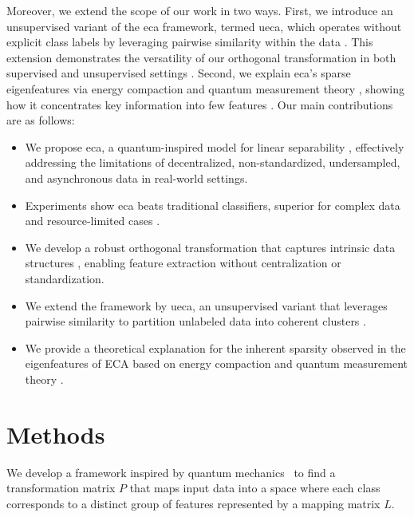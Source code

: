 \documentclass[lettersize,journal]{IEEEtran}
\begin{document}
Moreover, we extend the scope of our work in two ways. First, we introduce an unsupervised variant of the \gls{eca} framework, termed \gls{ueca}, which operates without explicit class labels by leveraging pairwise similarity within the data \cite{wang2022preserving, niu2023multi}. This extension demonstrates the versatility of our orthogonal transformation in both supervised and unsupervised settings \cite{fang2017orthogonal, kerenidis2021classical}. Second, we explain \gls{eca}'s sparse eigenfeatures via energy compaction \cite{bandoh2009mathematical, tuqan2000state} and quantum measurement theory \cite{nielsen2010quantum}, showing how it concentrates key information into few features \cite{lin2020sparsity}. Our main contributions are as follows:
\begin{itemize}
\item We propose \gls{eca}, a quantum-inspired model for linear separability \cite{chia2020quantum}, effectively addressing the limitations of decentralized, non-standardized, undersampled, and asynchronous data in real-world settings.
\item Experiments show \gls{eca} beats traditional classifiers, superior for complex data and resource-limited cases \cite{shao2022faster}.
\item We develop a robust orthogonal transformation that captures intrinsic data structures \cite{kerenidis2021classical, fang2017orthogonal}, enabling feature extraction without centralization or standardization.
\item We extend the framework by \gls{ueca}, an unsupervised variant that leverages pairwise similarity to partition unlabeled data into coherent clusters \cite{niu2023multi, petty2022pairwise, wang2022preserving}.
\item We provide a theoretical explanation for the inherent sparsity observed in the eigenfeatures of ECA based on energy compaction \cite{bandoh2009mathematical, tuqan2000state} and quantum measurement theory \cite{nielsen2010quantum, lin2020sparsity}.
\end{itemize}


\section{Methods}
We develop a framework inspired by quantum mechanics~\cite{ciliberto2018quantum, schuld2015introduction} to find a transformation matrix \( P \) that maps input data into a space where each class corresponds to a distinct group of features represented by a mapping matrix \( L \). 
\end{document}
